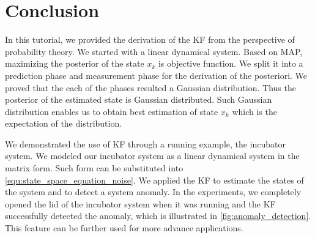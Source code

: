 \section{Conclusion} \label{sec:conclusion}

In this tutorial, we provided the derivation of the KF from the perspective of probability theory. We started with a linear dynamical system. 
Based on MAP, maximizing the posterior of the state $x_k$ is objective function. We split it into a prediction phase and measurement phase for the derivation of the posteriori. 
We proved that the each of the phases resulted a Gaussian distribution. 
Thus the posterior of the estimated state is Gaussian distributed. 
Such Gaussian distribution enables us to obtain best estimation of state $x_k$ which is the expectation of the distribution. 

We demonstrated the use of KF through a running example, the incubator system. 
We modeled our incubator system as a linear dynamical system in the matrix form. Such form can be substituted into \cref{equ:state_space_equation_noise}. 
We applied the KF to estimate the states of the system and to detect a system anomaly. In the experiments, we completely opened the lid of the incubator system when it was running and the KF successfully detected the anomaly, which is illustrated in \cref{fig:anomaly_detection}.
This feature can be further used for more advance applications. 
